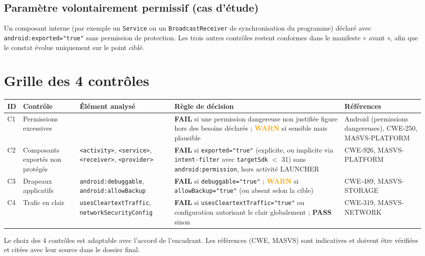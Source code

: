 \documentclass[11pt,a4paper]{article}
\newcommand{\code}[1]{{\NoAutoSpacing\texttt{\small #1}}}
\newcommand{\code}[1]{{\texttt{\small #1}}}
\newcommand{\PASS}{\textbf{\textcolor{vert}{PASS}}}
\newcommand{\FAIL}{\textbf{\textcolor{rouge}{FAIL}}}
\newcommand{\WARN}{\textbf{\textcolor{orange}{WARN}}}
\begin{document}
\subsection{Paramètre volontairement permissif (cas d'étude)}
Un composant interne (par exemple un \code{Service} ou un \code{BroadcastReceiver} de synchronisation du programme) déclaré avec \code{android:exported="true"} sans permission de protection. Les trois autres contrôles restent conformes dans le manifeste « avant », afin que le constat évolue uniquement sur le point ciblé.

\section{Grille des 4 contrôles}
\begin{longtable}{@{}L{0.8cm}L{2.4cm}L{2.9cm}L{4.6cm}L{2.7cm}@{}}
\color{white}\bfseries ID & \color{white}\bfseries Contrôle & \color{white}\bfseries Élément analysé & \color{white}\bfseries Règle de décision & \color{white}\bfseries Références\\
\endhead
C1 & Permissions excessives & \code{<uses-permission>} & \FAIL{} si une permission dangereuse non justifiée figure hors des besoins déclarés ; \WARN{} si sensible mais plausible & Android (permissions dangereuses), CWE-250, MASVS-PLATFORM\\
C2 & Composants exportés non protégés & \code{<activity>}, \code{<service>}, \code{<receiver>}, \code{<provider>} & \FAIL{} si \code{exported="true"} (explicite, ou implicite via \code{intent-filter} avec \code{targetSdk} $<$ 31) sans \code{android:permission}, hors activité LAUNCHER & CWE-926, MASVS-PLATFORM\\
C3 & Drapeaux applicatifs & \code{android:debuggable}, \code{android:allowBackup} & \FAIL{} si \code{debuggable="true"} ; \WARN{} si \code{allowBackup="true"} (ou absent selon la cible) & CWE-489, MASVS-STORAGE\\
C4 & Trafic en clair & \code{usesCleartextTraffic}, \code{networkSecurityConfig} & \FAIL{} si \code{usesCleartextTraffic="true"} ou configuration autorisant le clair globalement ; \PASS{} sinon & CWE-319, MASVS-NETWORK\\
\end{longtable}

\begin{remarque}[À valider]
Le choix des 4 contrôles est adaptable avec l'accord de l'encadrant. Les références (CWE, MASVS) sont indicatives et doivent être vérifiées et citées avec leur source dans le dossier final.
\end{remarque}
\end{document}
